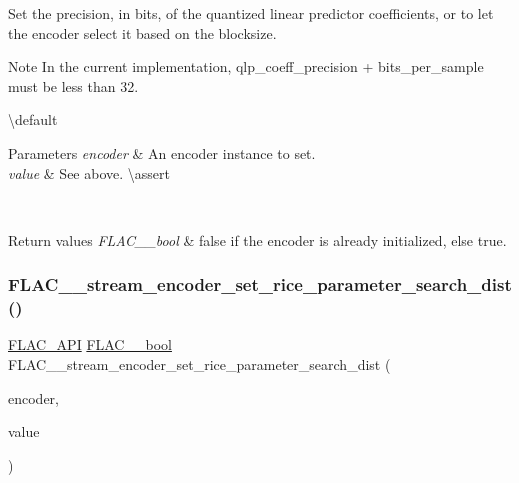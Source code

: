 Set the precision, in bits, of the quantized linear predictor coefficients, or {} to let the encoder select it based on the blocksize.

\begin{DoxyNote}{Note}
In the current implementation, qlp\+\_\+coeff\+\_\+precision + bits\+\_\+per\+\_\+sample must be less than 32.
\end{DoxyNote}
\textbackslash{}default {} 
\begin{DoxyParams}{Parameters}
{\em encoder} & An encoder instance to set. \\
\hline
{\em value} & See above. \textbackslash{}assert 
\begin{DoxyCode}{1}
\end{DoxyCode}
 \\
\hline
\end{DoxyParams}

\begin{DoxyRetVals}{Return values}
{\em F\+L\+A\+C\+\_\+\+\_\+bool} & {\ttfamily false} if the encoder is already initialized, else {\ttfamily true}. \\
\hline
\end{DoxyRetVals}
\mbox{\label{group__flac__stream__encoder_ga668de93e7061bce21475c062ffab3e18}} 
\subsubsection{\texorpdfstring{FLAC\_\_stream\_encoder\_set\_rice\_parameter\_search\_dist()}{FLAC\_\_stream\_encoder\_set\_rice\_parameter\_search\_dist()}}
{\footnotesize\ttfamily \mbox{\hyperlink{group__flac__export_ga56ca07df8a23310707732b1c0007d6f5}{F\+L\+A\+C\+\_\+\+A\+PI}} \mbox{\hyperlink{ordinals_8h_a95103469f1cbd78b8cf250194985b34e}{F\+L\+A\+C\+\_\+\+\_\+bool}} F\+L\+A\+C\+\_\+\+\_\+stream\+\_\+encoder\+\_\+set\+\_\+rice\+\_\+parameter\+\_\+search\+\_\+dist (\begin{DoxyParamCaption}\item[{\mbox{\hyperlink{struct_f_l_a_c_____stream_encoder}{F\+L\+A\+C\+\_\+\+\_\+\+Stream\+Encoder}} $\ast$}]{encoder,  }\item[{unsigned}]{value }\end{DoxyParamCaption})}

